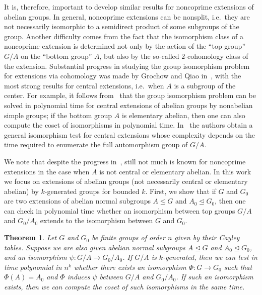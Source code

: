 \documentclass{article}
\newtheorem{theorem}{Theorem}[section]
\begin{document}
It is, therefore, important to develop similar results for noncoprime extensions of abelian groups.
In general, noncoprime extensions can be nonsplit, i.e.\ they are not necessarily isomorphic to a semidirect product of some subgroups of the group.
Another difficulty comes from the fact that the isomorphism class of a noncoprime extension is determined not only by the action of the ``top group'' \( G/A \)
on the ``bottom group'' \( A \), but also by the so-called \( 2 \)-cohomology class of the extension. Substantial progress in studying the group isomorphism problem
for extensions via cohomology was made by Grochow and Qiao in~\cite{grochow}, with the most strong results for central extensions, i.e.\ when \( A \) is a subgroup
of the center. For example, it follows from~\cite[Corollary~6.3]{grochow} that the group isomorphism problem can be solved in polynomial time
for central extensions of abelian groups by nonabelian simple groups; if the bottom group \( A \) is elementary abelian, then one can also
compute the coset of isomorphisms in polynomial time. In~\cite[Theorem~6.1]{grochow} the authors obtain a general isomorphism test for central extensions
whose complexity depends on the time required to enumerate the full automorphism group of \( G/A \).

We note that despite the progress in~\cite{grochow}, still not much is known for noncoprime extensions in the case when \( A \) is not central
or elementary abelian. In this work we focus on extensions of abelian groups (not necessarily central or elementary abelian)
by \( k \)-generated groups for bounded \( k \). First, we show that if \( G \) and \( G_0 \) are two extensions
of abelian normal subgroups \( A \unlhd G \) and \( A_0 \unlhd G_0 \), then one can check in polynomial time whether an isomorphism
between top groups \( G/A \) and \( G_0/A_0 \) extends to the isomorphism between \( G \) and \( G_0 \).

\begin{theorem}\label{main}
	Let \( G \) and \( G_0 \) be finite groups of order \( n \) given by their Cayley tables.
	Suppose we are also given abelian normal subgroups \( A \unlhd G \) and \( A_0 \unlhd G_0 \),
	and an isomorphism \( \psi : G/A \to G_0/A_0 \). If \( G/A \) is \( k \)-generated, then
	we can test in time polynomial in \( n^k \) whether there exists an isomorphism \( \Phi : G \to G_0 \) such that \( \Phi(A) = A_0 \)
	and \( \Phi \) induces \( \psi \) between \( G/A \) and \( G_0/A_0 \).
	If such an isomorphism exists, then we can compute the coset of such isomorphisms in the same time.
\end{theorem}
\end{document}
